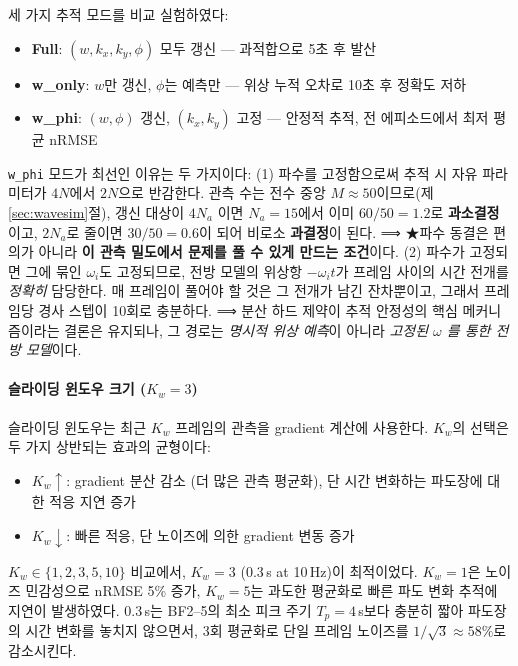 \documentclass[11pt]{report}
\numberwithin{equation}{chapter}
\numberwithin{figure}{chapter}
\numberwithin{table}{chapter}
\begin{document}
세 가지 추적 모드를 비교 실험하였다:
\begin{itemize}
  \item \textbf{Full}: $(w, k_x, k_y, \phi)$ 모두 갱신 ---
        과적합으로 5초 후 발산
  \item \textbf{w\_only}: $w$만 갱신, $\phi$는 예측만 ---
        위상 누적 오차로 10초 후 정확도 저하
  \item \textbf{w\_phi}: $(w, \phi)$ 갱신, $(k_x, k_y)$ 고정 ---
        안정적 추적, 전 에피소드에서 최저 평균 nRMSE
\end{itemize}

\texttt{w\_phi} 모드가 최선인 이유는 두 가지이다:
(1) 파수를 고정함으로써 추적 시 자유 파라미터가 $4N$에서 $2N$으로 반감한다.
관측 수는 전수 중앙 $M \approx 50$이므로(제\ref{sec:wavesim}절), 갱신 대상이 $4N_a$
이면 $N_a = 15$에서 이미 $60/50 = 1.2$로 \textbf{과소결정}이고, $2N_a$로 줄이면
$30/50 = 0.6$이 되어 비로소 \textbf{과결정}이 된다.
⟹ ★파수 동결은 편의가 아니라 \textbf{이 관측 밀도에서 문제를 풀 수 있게 만드는 조건}이다.
(2) 파수가 고정되면 그에 묶인 $\omega_i$도 고정되므로, 전방 모델의 위상항
$-\omega_i t$가 프레임 사이의 시간 전개를 \emph{정확히} 담당한다. 매 프레임이 풀어야 할
것은 그 전개가 남긴 잔차뿐이고, 그래서 프레임당 경사 스텝이 10회로 충분하다.
⟹ 분산 하드 제약이 추적 안정성의 핵심 메커니즘이라는 결론은 유지되나,
그 경로는 \emph{명시적 위상 예측}이 아니라 \emph{고정된 $\omega$ 를 통한 전방 모델}이다.

\paragraph{슬라이딩 윈도우 크기 ($K_w = 3$)}
슬라이딩 윈도우는 최근 $K_w$ 프레임의 관측을 gradient 계산에 사용한다.
$K_w$의 선택은 두 가지 상반되는 효과의 균형이다:
\begin{itemize}
  \item $K_w \uparrow$: gradient 분산 감소 (더 많은 관측 평균화),
        단 시간 변화하는 파도장에 대한 적응 지연 증가
  \item $K_w \downarrow$: 빠른 적응, 단 노이즈에 의한 gradient 변동 증가
\end{itemize}
$K_w \in \{1, 2, 3, 5, 10\}$ 비교에서, $K_w = 3$ (0.3\,s at 10\,Hz)이
최적이었다. $K_w = 1$은 노이즈 민감성으로 nRMSE 5\% 증가,
$K_w = 5$는 과도한 평균화로 빠른 파도 변화 추적에 지연이 발생하였다.
0.3\,s는 BF2--5의 최소 피크 주기 $T_p = 4$\,s보다 충분히 짧아
파도장의 시간 변화를 놓치지 않으면서, 3회 평균화로 단일 프레임
노이즈를 $1/\sqrt{3} \approx 58\%$로 감소시킨다.
\end{document}
